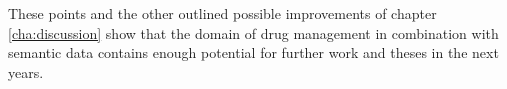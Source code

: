 These points and the other outlined possible improvements of chapter \ref{cha:discussion} show that the domain of drug management in combination with semantic data contains enough potential for further work and theses in the next years.


